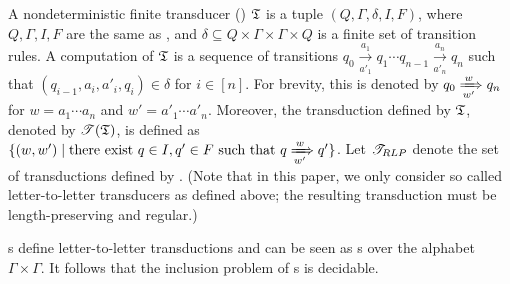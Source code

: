 A nondeterministic finite transducer  (\NFT) ${\mathfrak{T} }$ is a tuple $(Q, \Gamma, \delta, I, F)$, 
where $Q, \Gamma, I, F$ are the same as \NFA, %
and %
$\delta \subseteq Q \times \Gamma \times \Gamma \times Q$ is a finite set of transition rules.
%
A computation of ${\mathfrak{T} }$ is a sequence of transitions
$
q_0 \xrightarrow[a'_1]{a_1} q_1  %
\cdots q_{n-1} \xrightarrow[a'_n]{a_n} q_n 
$
such that $(q_{i-1}, a_i, a'_i, q_i) \in \delta$ for $i \in [n]$. For brevity, this is denoted by  $q_0 \xRightarrow[w']{w} q_n$ for $w= a_1 \cdots a_n$ and $w'= a'_1 \cdots a'_n$. %
Moreover, the transduction defined by ${\mathfrak{T} }$, denoted by ${\mathscr{T} }({\mathfrak{T} })$, is defined as $\{(w, w') \mid \mbox{there exist } q \in I, q' \in F \mbox{ such that } q \xRightarrow[w']{w} q'\}$. Let ${\mathscr{T}_{RLP} }$ denote the set of transductions defined by \NFT. (Note that in this paper, we only consider so called letter-to-letter transducers as defined above; the resulting transduction must be length-preserving and regular.)
%


{\NFT}s define letter-to-letter transductions and can be seen as {\NFA}s over the alphabet $\Gamma \times \Gamma$. It follows that the inclusion problem of {\NFT}s is decidable.

